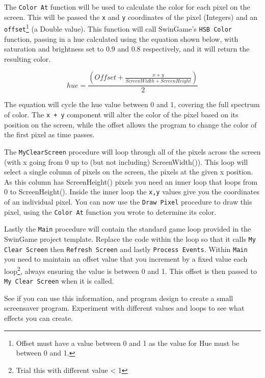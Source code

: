 \begin{enumerate}
\clearpage

The \texttt{Color At} function will be used to calculate the color for each pixel on the screen. This will be passed the \texttt{x} and \texttt{y} coordinates of the pixel (Integers) and an \texttt{offset}\footnote{Offset must have a value between 0 and 1 as the value for Hue must be between 0 and 1.} (a Double value). This function will call SwinGame's \texttt{HSB Color} function, passing in a hue calculated using the equation shown below, with saturation and brightness set to 0.9 and 0.8 respectively, and it will return the resulting color.

\begin{equation}
  hue = \frac{\displaystyle (Offset + \frac{x + y}{Screen Width + Screen Height})}{2}
\end{equation}

The equation will cycle the hue value between 0 and 1, covering the full spectrum of color. The \texttt{x + y} component will alter the color of the pixel based on its position on the screen, while the offset allows the program to change the color of the first pixel as time passes.

The \texttt{MyClearScreen} procedure will loop through all of the pixels across the screen (with x going from 0 up to (but not including) ScreenWidth()). This loop will select a single column of pixels on the screen, the pixels at the given x position. As this column has ScreenHeight() pixels you need an inner loop that loops from 0 to ScreenHeight(). Inside the inner loop the \texttt{x,y} values give you the coordinates of an individual pixel. You can now use the \texttt{Draw Pixel} procedure to draw this pixel, using the \texttt{Color At} function you wrote to determine its color.

Lastly the \texttt{Main} procedure will contain the standard game loop provided in the SwinGame project template. Replace the code within the loop so that it calls \texttt{My Clear Screen} then \texttt{Refresh Screen} and lastly \texttt{Process Events}. Within \texttt{Main} you need to maintain an offset value that you increment by a fixed value each loop\footnote{Trial this with different value < 1}, always ensuring the value is between 0 and 1. This offset is then passed to \texttt{My Clear Screen} when it is called.

See if you can use this information, and program design to create a small screensaver program. Experiment with different values and loops to see what effects you can create.
\end{enumerate}

